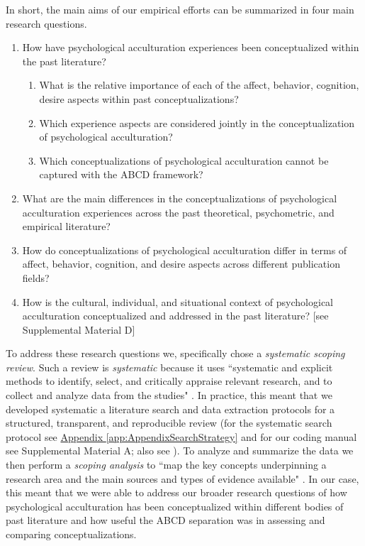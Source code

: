 \documentclass[man, 12pt, a4paper, mask]{apa7}
\newcommand{\appref}[2][]{\hyperref[#2]{Appendix \ref*{#2}#1}}
\newcommand{\sicodingmanual}{Supplemental Material A}
\newcommand{\sicontext}{Supplemental Material D}
\begin{document}
In short, the main aims of our empirical efforts can be summarized in four main research questions.
\begin{enumerate}[noitemsep,topsep=0pt,label=RQ \arabic*:,leftmargin=1.8cm]
    \item How have psychological acculturation experiences been conceptualized within the past literature?
    \begin{enumerate}[noitemsep,topsep=0pt,label=(RQ 1\alph*):,leftmargin=1.64cm]
        \item What is the relative importance of each of the affect, behavior, cognition, desire aspects within past conceptualizations?
        \item Which experience aspects are considered jointly in the conceptualization of psychological acculturation?
        \item Which conceptualizations of psychological acculturation cannot be captured with the ABCD framework?
    \end{enumerate}
    \item What are the main differences in the conceptualizations of psychological acculturation experiences across the past theoretical, psychometric, and empirical literature?
    \item How do conceptualizations of psychological acculturation differ in terms of affect, behavior, cognition, and desire aspects across different publication fields?
    \item How is the cultural, individual, and situational context of psychological acculturation conceptualized and addressed in the past literature? [see \sicontext]
\end{enumerate}

To address these research questions we, specifically chose a \textit{systematic scoping review}. Such a review is \textit{systematic} because it uses ``systematic and explicit methods to identify, select, and critically appraise relevant research, and to collect and analyze data from the studies" \citep[PRISMA guidelines; ][p. 1]{Moher2009}. In practice, this meant that we developed systematic a literature search and data extraction protocols for a structured, transparent, and reproducible review (for the systematic search protocol see \appref{app:AppendixSearchStrategy} and for our coding manual see \sicodingmanual; also see \citealp{Peters2015}). To analyze and summarize the data we then perform a \textit{scoping analysis} to ``map the key concepts underpinning a research area and the main sources and types of evidence available" \citep[][p.21]{Arksey2005}. In our case, this meant that we were able to address our broader research questions of how psychological acculturation has been conceptualized within different bodies of past literature and how useful the ABCD separation was in assessing and comparing conceptualizations.
\end{document}
